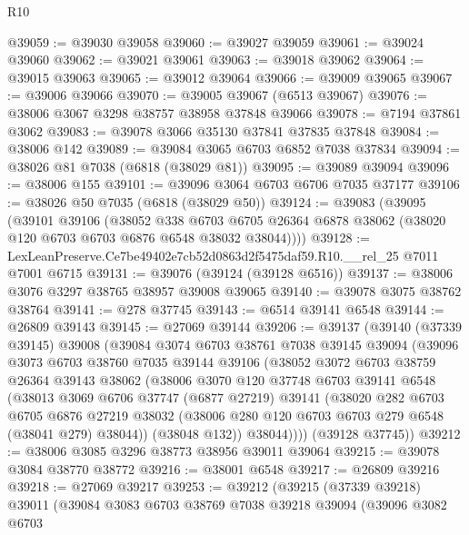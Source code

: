\begin{lexlean}{R10}
\begin{coremodule}
@39059 := @39030 @39058
@39060 := @39027 @39059
@39061 := @39024 @39060
@39062 := @39021 @39061
@39063 := @39018 @39062
@39064 := @39015 @39063
@39065 := @39012 @39064
@39066 := @39009 @39065
@39067 := @39006 @39066
@39070 := @39005 @39067 (@6513 @39067)
@39076 := @38006 @3067 @3298 @38757 @38958 @37848 @39066
@39078 := @7194 @37861 @3062
@39083 := @39078 @3066 @35130 @37841 @37835 @37848
@39084 := @38006 @142
@39089 := @39084 @3065 @6703 @6852 @7038 @37834
@39094 := @38026 @81 @7038 (@6818 (@38029 @81))
@39095 := @39089 @39094
@39096 := @38006 @155
@39101 := @39096 @3064 @6703 @6706 @7035 @37177
@39106 := @38026 @50 @7035 (@6818 (@38029 @50))
@39124 := @39083
    (@39095
      (@39101
        @39106
        (@38052
          @338
          @6703
          @6705
          @26364
          @6878
          @38062
          (@38020 @120 @6703 @6703 @6876 @6548 @38032 @38044))))
@39128 := LexLeanPreserve.Ce7be49402e7cb52d0863d2f5475daf59.R10.__rel_25 @7011 @7001 @6715
@39131 := @39076 (@39124 (@39128 @6516))
@39137 := @38006 @3076 @3297 @38765 @38957 @39008 @39065
@39140 := @39078 @3075 @38762 @38764
@39141 := @278 @37745
@39143 := @6514 @39141 @6548
@39144 := @26809 @39143
@39145 := @27069 @39144
@39206 := @39137
    (@39140
      (@37339 @39145)
      @39008
      (@39084
        @3074
        @6703
        @38761
        @7038
        @39145
        @39094
        (@39096
          @3073
          @6703
          @38760
          @7035
          @39144
          @39106
          (@38052
            @3072
            @6703
            @38759
            @26364
            @39143
            @38062
            (@38006
              @3070
              @120
              @37748
              @6703
              @39141
              @6548
              (@38013
                @3069
                @6706
                @37747
                (@6877 @27219)
                @39141
                (@38020
                  @282
                  @6703
                  @6705
                  @6876
                  @27219
                  @38032
                  (@38006 @280 @120 @6703 @6703 @279 @6548 (@38041 @279) @38044))
                (@38048 @132))
              @38044))))
      (@39128 @37745))
@39212 := @38006 @3085 @3296 @38773 @38956 @39011 @39064
@39215 := @39078 @3084 @38770 @38772
@39216 := @38001 @6548
@39217 := @26809 @39216
@39218 := @27069 @39217
@39253 := @39212
    (@39215
      (@37339 @39218)
      @39011
      (@39084
        @3083
        @6703
        @38769
        @7038
        @39218
        @39094
        (@39096
          @3082
          @6703

\end{coremodule}
\end{lexlean}
